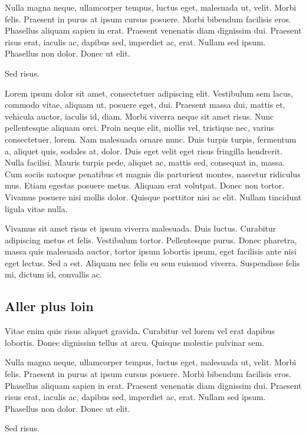 Nulla magna neque, ullamcorper tempus, luctus eget, malesuada ut, velit. Morbi
felis. Praesent in purus at ipsum cursus posuere. Morbi bibendum facilisis eros.
Phasellus aliquam sapien in erat. Praesent venenatis diam dignissim dui.
Praesent risus erat, iaculis ac, dapibus sed, imperdiet ac, erat. Nullam sed
ipsum. Phasellus non dolor. Donec ut elit.

Sed risus.

Lorem ipsum dolor sit amet, consectetuer adipiscing elit. Vestibulum sem lacus,
commodo vitae, aliquam ut, posuere eget, dui. Praesent massa dui, mattis et,
vehicula auctor, iaculis id, diam. Morbi viverra neque sit amet risus. Nunc
pellentesque aliquam orci. Proin neque elit, mollis vel, tristique nec, varius
consectetuer, lorem. Nam malesuada ornare nunc. Duis turpis turpis, fermentum a,
aliquet quis, sodales at, dolor. Duis eget velit eget risus fringilla hendrerit.
Nulla facilisi. Mauris turpis pede, aliquet ac, mattis sed, consequat in, massa.
Cum sociis natoque penatibus et magnis dis parturient montes, nascetur ridiculus
mus. Etiam egestas posuere metus. Aliquam erat volutpat. Donec non tortor.
Vivamus posuere nisi mollis dolor. Quisque porttitor nisi ac elit. Nullam
tincidunt ligula vitae nulla.

Vivamus sit amet risus et ipsum viverra malesuada. Duis luctus. Curabitur
adipiscing metus et felis. Vestibulum tortor. Pellentesque purus. Donec
pharetra, massa quis malesuada auctor, tortor ipsum lobortis ipsum, eget
facilisis ante nisi eget lectus. Sed a est. Aliquam nec felis eu sem euismod
viverra. Suspendisse felis mi, dictum id, convallis ac.


\subsection{Aller plus loin}
\label{conclu:persp:loin}

Vitae enim quis risus aliquet gravida. Curabitur vel lorem vel erat dapibus
lobortis. Donec dignissim tellus at arcu. Quisque molestie pulvinar sem.

Nulla magna neque, ullamcorper tempus, luctus eget, malesuada ut, velit. Morbi
felis. Praesent in purus at ipsum cursus posuere. Morbi bibendum facilisis eros.
Phasellus aliquam sapien in erat. Praesent venenatis diam dignissim dui.
Praesent risus erat, iaculis ac, dapibus sed, imperdiet ac, erat. Nullam sed
ipsum. Phasellus non dolor. Donec ut elit.

Sed risus.


